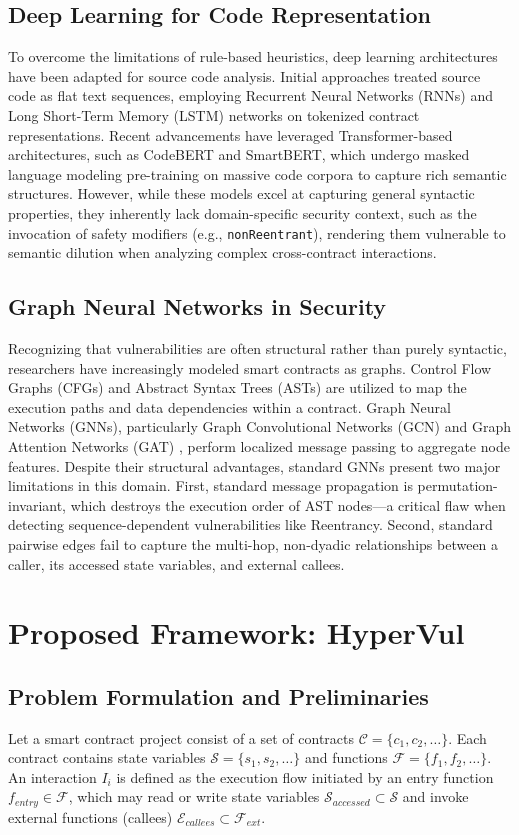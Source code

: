 \documentclass[conference]{IEEEtran}
\begin{document}
\subsection{Deep Learning for Code Representation}
To overcome the limitations of rule-based heuristics, deep learning architectures have been adapted for source code analysis. Initial approaches treated source code as flat text sequences, employing Recurrent Neural Networks (RNNs) and Long Short-Term Memory (LSTM) networks on tokenized contract representations. Recent advancements have leveraged Transformer-based architectures, such as CodeBERT and SmartBERT, which undergo masked language modeling pre-training on massive code corpora to capture rich semantic structures. However, while these models excel at capturing general syntactic properties, they inherently lack domain-specific security context, such as the invocation of safety modifiers (e.g., \texttt{nonReentrant}), rendering them vulnerable to semantic dilution when analyzing complex cross-contract interactions.

\subsection{Graph Neural Networks in Security}
Recognizing that vulnerabilities are often structural rather than purely syntactic, researchers have increasingly modeled smart contracts as graphs. Control Flow Graphs (CFGs) and Abstract Syntax Trees (ASTs) are utilized to map the execution paths and data dependencies within a contract. Graph Neural Networks (GNNs), particularly Graph Convolutional Networks (GCN) \cite{gcn} and Graph Attention Networks (GAT) \cite{gat}, perform localized message passing to aggregate node features. Despite their structural advantages, standard GNNs present two major limitations in this domain. First, standard message propagation is permutation-invariant, which destroys the execution order of AST nodes—a critical flaw when detecting sequence-dependent vulnerabilities like Reentrancy. Second, standard pairwise edges fail to capture the multi-hop, non-dyadic relationships between a caller, its accessed state variables, and external callees.

\section{Proposed Framework: HyperVul}

\subsection{Problem Formulation and Preliminaries}
Let a smart contract project consist of a set of contracts $\mathcal{C}=\{c_1,c_2,\dots\}$. Each contract contains state variables $\mathcal{S}=\{s_1,s_2,\dots\}$ and functions $\mathcal{F}=\{f_1,f_2,\dots\}$. An interaction $I_i$ is defined as the execution flow initiated by an entry function $f_{entry}\in\mathcal{F}$, which may read or write state variables $\mathcal{S}_{accessed}\subset\mathcal{S}$ and invoke external functions (callees) $\mathcal{E}_{callees}\subset\mathcal{F}_{ext}$.
\end{document}

